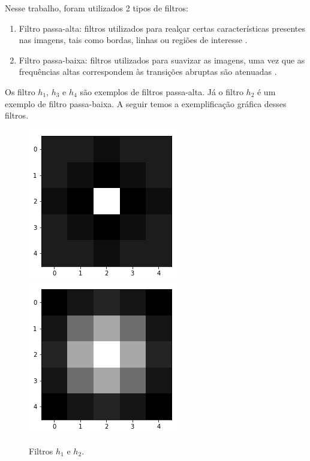 \documentclass[twoside,twocolumn]{article}
\begin{document}
Nesse trabalho, foram utilizados 2 tipos de filtros:

\begin{enumerate}
	\item Filtro passa-alta: filtros utilizados para realçar certas características presentes nas imagens, tais como bordas, linhas ou regiões de interesse \cite{b2}.
	\item Filtro passa-baixa: filtros utilizados para suavizar as imagens, uma vez que as frequências altas correspondem às transições abruptas são atenuadas \cite{b2}.
\end{enumerate}

Os filtro $h_{1}$, $h_{3}$ e $h_{4}$ são exemplos de filtros passa-alta. Já o filtro $h_{2}$ é um exemplo de filtro passa-baixa. A seguir temos a exemplificação gráfica desses filtros.

\begin{figure}[H]
\begin{center}
	\includegraphics[scale=.3]{figures/h1.png}
	\includegraphics[scale=.3]{figures/h2.png}
\caption{Filtros $h_{1}$ e $h_{2}$.} \label{gdimotes}
\end{center}
\end{figure}
\end{document}
